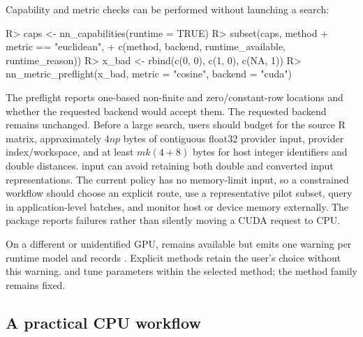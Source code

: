 \documentclass[article]{jss}
\newcommand{\method}[1]{\code{#1}}
\begin{document}
Capability and metric checks can be performed without launching a search:
\begin{CodeChunk}
\begin{CodeInput}
R> caps <- nn_capabilities(runtime = TRUE)
R> subset(caps, method %
+              metric == "euclidean",
+        c(method, backend, runtime_available, runtime_reason))
R> x_bad <- rbind(c(0, 0), c(1, 0), c(NA, 1))
R> nn_metric_preflight(x_bad, metric = "cosine", backend = "cuda")
\end{CodeInput}
\end{CodeChunk}
The preflight reports one-based non-finite and zero/constant-row locations and
whether the requested backend would accept them. The requested backend remains
unchanged. Before a large search, users should budget for the source R
matrix, approximately $4np$ bytes of contiguous float32 provider input,
provider index/workspace, and at least $mk(4+8)$ bytes for host integer
identifiers and double distances.  input can avoid retaining both
double and converted input representations. The current \method{auto} policy
has no memory-limit input, so a constrained workflow should choose an explicit route,
use a representative pilot subset, query in application-level batches, and
monitor host or device memory externally. The package reports failures rather
than silently moving a CUDA request to CPU.

On a different or unidentified GPU, \method{auto} remains available but emits one
warning per runtime model and records
. Explicit methods retain the user's
choice without this warning.  and 
tune parameters within the selected method; the method family remains fixed.

\subsection{A practical CPU workflow}
\end{document}
